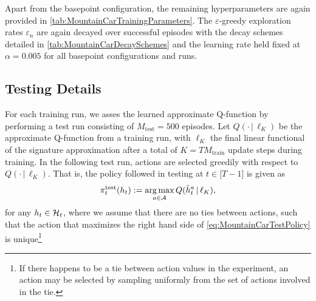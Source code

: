\documentclass[
    a4paper,
    11pt,
    bibliography=totoc,
    listof=totoc,      
    headinclude=true,
    cleardoublepage=empty,
]{scrbook}
\theoremstyle{plain}
\theoremstyle{definition}
\theoremstyle{remark}
\newcommand{\SpaceA}{{\cal A}}
\newcommand{\SpaceH}{{\cal H}}
\DeclareMathOperator*{\argmax}{arg\,max}
\begin{document}
Apart from the basepoint configuration, the remaining hyperparameters are
again provided in \cref{tab:MountainCarTrainingParameters}. The 
$\varepsilon$-greedy exploration rates $\varepsilon_n$ are again decayed over
successful episodes with the decay schemes detailed in
\cref{tab:MountainCarDecaySchemes} and the learning rate held fixed at
$\alpha=0.005$ for all basepoint configurations and runs.

\subsection{Testing Details} 
\label{chapter:Experiments:section:MountainCar:sub:TestingDetails}

For each training run, we asses the learned approximate Q-function by
performing a test run consisting of $M_\text{test} = 500$ episodes. Let
$Q(\cdot \,|\,\ell_K)$ be the approximate Q-function from a training run, with 
$\ell_K$ the final linear functional of the signature approximation after a
total of $K=T M_\text{train}$ update steps during training. In the
following test run, actions are selected greedily with respect to $Q(\cdot \,|
\, \ell_K)$. That is, the policy followed in testing at $t\in[T-1$] is
given as
\begin{equation}
\label{eq:MountainCarTestPolicy}
    \pi^{\text{test}}_t(h_t) 
    := \argmax_{a\in\SpaceA} Q(\hat{h}_t^a\,|\,\ell_K),
\end{equation}
for any $h_t\in\SpaceH_t$, where we assume that there are no ties between
actions, such that the action that maximizes the right hand side of 
\eqref{eq:MountainCarTestPolicy} is unique\footnote{
    If there happens to be a tie between action values in the experiment, an
    action may be selected by sampling uniformly from the set of actions 
    involved in the tie.
}
\end{document}
